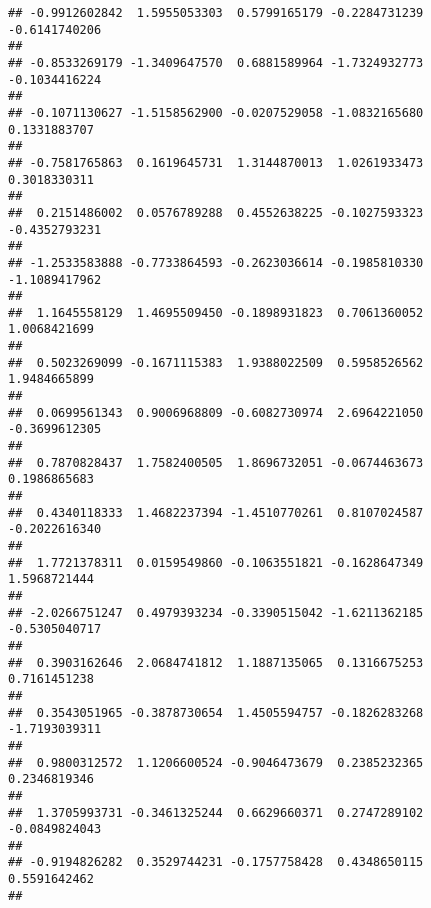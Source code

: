 \documentclass[]{article}
\begin{document}
\begin{verbatim}
## -0.9912602842  1.5955053303  0.5799165179 -0.2284731239 -0.6141740206 
##                                                                       
## -0.8533269179 -1.3409647570  0.6881589964 -1.7324932773 -0.1034416224 
##                                                                       
## -0.1071130627 -1.5158562900 -0.0207529058 -1.0832165680  0.1331883707 
##                                                                       
## -0.7581765863  0.1619645731  1.3144870013  1.0261933473  0.3018330311 
##                                                                       
##  0.2151486002  0.0576789288  0.4552638225 -0.1027593323 -0.4352793231 
##                                                                       
## -1.2533583888 -0.7733864593 -0.2623036614 -0.1985810330 -1.1089417962 
##                                                                       
##  1.1645558129  1.4695509450 -0.1898931823  0.7061360052  1.0068421699 
##                                                                       
##  0.5023269099 -0.1671115383  1.9388022509  0.5958526562  1.9484665899 
##                                                                       
##  0.0699561343  0.9006968809 -0.6082730974  2.6964221050 -0.3699612305 
##                                                                       
##  0.7870828437  1.7582400505  1.8696732051 -0.0674463673  0.1986865683 
##                                                                       
##  0.4340118333  1.4682237394 -1.4510770261  0.8107024587 -0.2022616340 
##                                                                       
##  1.7721378311  0.0159549860 -0.1063551821 -0.1628647349  1.5968721444 
##                                                                       
## -2.0266751247  0.4979393234 -0.3390515042 -1.6211362185 -0.5305040717 
##                                                                       
##  0.3903162646  2.0684741812  1.1887135065  0.1316675253  0.7161451238 
##                                                                       
##  0.3543051965 -0.3878730654  1.4505594757 -0.1826283268 -1.7193039311 
##                                                                       
##  0.9800312572  1.1206600524 -0.9046473679  0.2385232365  0.2346819346 
##                                                                       
##  1.3705993731 -0.3461325244  0.6629660371  0.2747289102 -0.0849824043 
##                                                                       
## -0.9194826282  0.3529744231 -0.1757758428  0.4348650115  0.5591642462 
##                                                                       

\end{verbatim}
\end{document}
